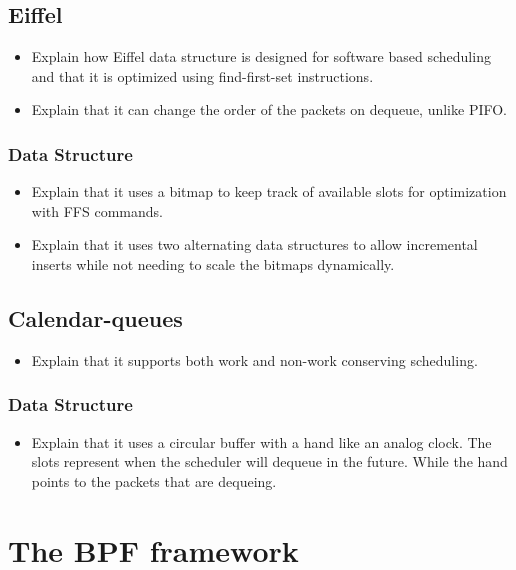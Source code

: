 \documentclass[sigconf, nonacm]{acmart}
\begin{document}
\subsection{Eiffel}

\begin{itemize}
  \item Explain how Eiffel\cite{Saeed2019} data structure is designed for software based scheduling and that it is optimized using find-first-set instructions.
  \item Explain that it can change the order of the packets on dequeue, unlike PIFO.
\end{itemize}


\subsubsection{Data Structure}

\begin{itemize}
  \item Explain that it uses a bitmap to keep track of available slots for optimization with FFS commands.
  \item Explain that it uses two alternating data structures to allow incremental inserts while not needing to scale the bitmaps dynamically.
\end{itemize}


\subsection{Calendar-queues}

\begin{itemize}
  \item Explain that it supports both work and non-work conserving scheduling.
\end{itemize}


\subsubsection{Data Structure}

\begin{itemize}
  \item Explain that it uses a circular buffer with a hand like an analog clock. The slots represent when the scheduler will dequeue in the future. While the hand points to the packets that are dequeing.
\end{itemize}


\section{The BPF framework}
\end{document}
